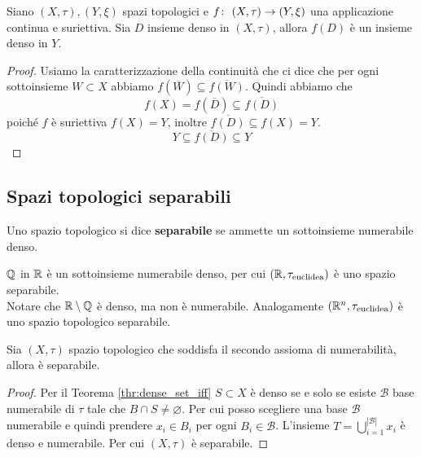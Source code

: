 \begin{theorem}
	Siano $(X,\tau), (Y, \xi)$ spazi topologici e $f \colon\ (X,\tau) \rightarrow (Y,\xi)$ una applicazione continua e suriettiva. Sia $D$ insieme denso in $(X,\tau)$, allora $f(D)$ è un insieme denso in $Y$.
\end{theorem}
\begin{proof}
	Usiamo la caratterizzazione della continuità che ci dice che per ogni sottoinsieme $W \subset X$ abbiamo $f(\overline{W}) \subseteq \overline{f(W)}$. Quindi abbiamo che 
	\begin{equation*}
		f(X) = f(\overline{D}) \subseteq \overline{f(D)}
	\end{equation*}
	poiché $f$ è suriettiva $f(X) = Y$, inoltre
	$\overline{f(D)}\subseteq f(X)=Y$.
	\begin{equation*}
	Y\subseteq\overline{f(D)}\subseteq Y
	\end{equation*}
\end{proof}



\subsection{\textcolor{TopGener}{\textbf{Spazi topologici separabili}}}



\begin{definition}
	Uno spazio topologico si dice \textbf{separabile} se ammette un sottoinsieme numerabile denso.
\end{definition}

\begin{example}
	$\mathbb{Q}$ in $\mathbb{R}$ è un sottoinsieme numerabile denso, per cui $(\mathbb{R}, \tau_{\text{euclidea}})$ è uno spazio separabile. \\ Notare che $\mathbb{R} \setminus \mathbb{Q}$ è denso, ma non è numerabile. Analogamente $(\mathbb{R}^n, \tau_{\text{euclidea}})$ è uno spazio topologico separabile.
\end{example}

\begin{theorem}
	Sia $(X, \tau)$ spazio topologico che soddisfa il secondo assioma di numerabilità, allora è separabile.	
\end{theorem}
\begin{proof}
	Per il Teorema \ref{thr:dense_set_iff} $S \subset X$ è denso se e solo se esiste $\mathcal{B}$ base numerabile di $\tau$ tale che $B \cap S \neq \varnothing$. Per cui posso scegliere una base $\mathcal{B}$ numerabile e quindi prendere $x_i \in B_i$ per ogni $B_i \in \mathcal{B}$. L'insieme $T = \bigcup^{|\mathcal{B}|}_{i=1} x_i$ è denso e numerabile. Per cui $(X, \tau)$ è separabile.
\end{proof}

